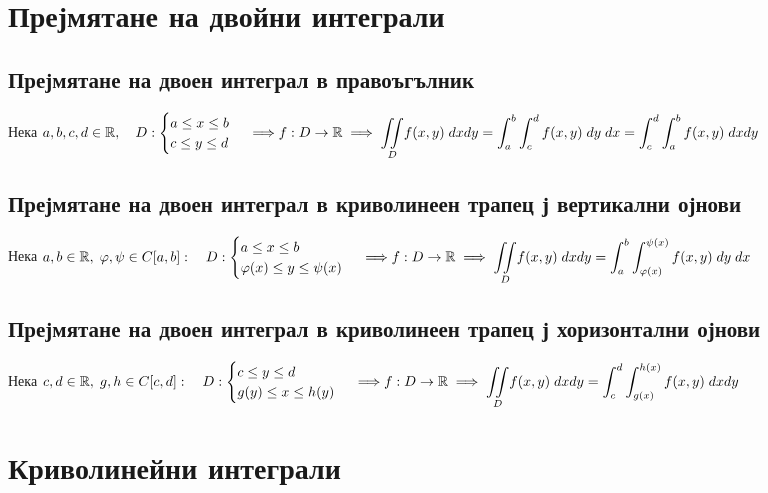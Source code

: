 \documentclass[14pt]{extarticle}
\newcommand{\R}{\mathbb{R}}
\newcommand{\Int}{\displaystyle\int}
\newcommand{\IInt}{\displaystyle\iint}
\begin{document}
\section*{Прејмятане на двойни интеграли}
\subsection*{Прејмятане на двоен интеграл в правоъгълник}
Нека \(a, b,c , d \in \R, \quad  D : \begin{cases}
    a \leq x \leq b \\
    c \leq y \leq d \\
\end{cases} \implies \\\\\\
f : D \to \R \implies \underset{D}{\IInt} f(x, y) \; dxdy = \Int_a^b\Int_c^d f(x, y) \; dy\; dx = \Int_c^d\Int_a^b f(x, y) \; dxdy\)
\subsection*{Прејмятане на двоен интеграл в криволинеен трапец ј вертикални ојнови}
Нека \(a, b \in \R, \; \varphi, \psi \in C[a, b] : \quad  D : \begin{cases}
    a \leq x \leq b \\
    \varphi(x) \leq y \leq \psi(x) \\
\end{cases} \implies \\\\\\
f : D \to \R \implies \underset{D}{\IInt} f(x, y) \; dxdy = \Int_a^b\Int_{\varphi(x)}^{\psi(x)} f(x, y) \; dy\; dx\)
\subsection*{Прејмятане на двоен интеграл в криволинеен трапец ј хоризонтални ојнови}
Нека \(c, d \in \R, \; g, h \in C[c, d] : \quad  D : \begin{cases}
    c \leq y \leq d \\
    g(y) \leq x \leq h(y) \\
\end{cases} \implies \\\\\\
f : D \to \R \implies \underset{D}{\IInt} f(x, y) \; dxdy = \Int_c^d\Int_{g(x)}^{h(x)} f(x, y) \; dxdy\)
\section*{Криволинейни интеграли}
\end{document}

